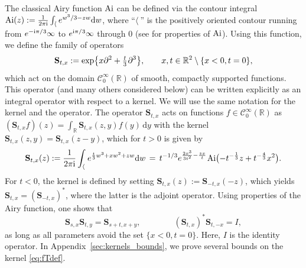 \documentclass[oneside,final,11pt]{amsart}
\theoremstyle{definition}
\renewcommand{\d}{\mathrm{d}}
\newcommand{\I}{{\rm i}}
\newcommand{\R}{\mathbb{R}}
\newcommand{\1}[1]{\mathbf{1}_{#1}}
\newcommand{\ts}{\hspace{0.1em}}
\newcommand{\tts}{\hspace{0.05em}}
\newcommand{\tsm}{\hspace{-0.1em}}
\newcommand{\uptext}[1]{\text{\upshape{#1}}}
\DeclareMathOperator{\Ai}{\uptext{Ai}}
\newcommand{\fT}{\mathbf{S}}
\numberwithin{equation}{section}
\begin{document}
The classical Airy function $\Ai$ can be defined via the contour integral $\Ai(z) := \frac1{2\pi\I} \int_{\langle} e^{w^3 / 3-z w} \d w$, where ``${\langle}~$'' is the positively oriented contour  running from $e^{-\I\pi/3}\infty$ to $e^{\I\pi/3}\infty$ through $0$ (see \cite{abrSteg, AiryBook, NIST:DLMF} for properties of $\Ai$). Using this function, we define the family of operators
\begin{equation}\label{eq:groupS}
\fT_{t,x} := \exp \bigl\{ x \partial^2 + \tfrac{t}3\tts\partial^3 \bigr\}, \qquad x, t\in\R^2\setminus \{x<0, t= 0\},
\end{equation}
which act on the domain $\mathscr{C}_0^\infty(\R)$ of smooth, compactly supported functions. This operator (and many others considered below) can be written explicitly as an integral operator with respect to a kernel. We will use the same notation for the kernel and the operator.
The operator $\fT_{t,x}$  acts on functions $f \in \mathscr{C}_0^\infty(\R)$ as $(\fT_{t,x} f)(z) = \int_\R \fT_{t,x}(z,y) f(y)\, \d y$ with the kernel $\fT_{t,x}(z,y) = \fT_{t,x}(z-y)$, which for $t > 0$ is given by
\begin{equation}\label{eq:fTdef}
\fT_{t,x}(z) := \frac1{2\pi\I} \int_{\langle}\ts e^{\frac{t}3 w^3+x  w^2+z w} \d w\, =\, t^{-1/3} e^{\frac{2 x^3}{3t^2}-\frac{zx}{t}}\tsm\Ai \bigl(-t^{-\frac{1}{3}} z+t^{-\frac{4}{3}}x^2\bigr).
\end{equation}
For $t<0$, the kernel is defined by setting $\fT_{t,x}(z) := \fT_{-t,x}(-z)$, which yields $\fT_{t,x}=(\fT_{-t,x})^*$, where the latter is the adjoint operator. Using properties of the Airy function, one shows that
\begin{equation}\label{eq:S_properties}
\fT_{s,x}\fT_{t,y}=\fT_{s+t,x+y}, \qquad\qquad (\fT_{t,x})^*\fT_{t,-x} = I,
\end{equation}
as long as all parameters avoid the set $\{x<0, t= 0\}$. Here, $I$ is the identity operator. %
In Appendix~\ref{sec:kernels_bounds}, we prove several bounds on the kernel \eqref{eq:fTdef}.
\end{document}
